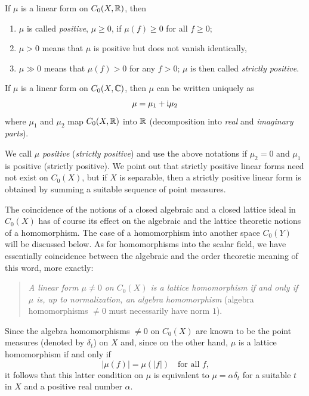 If\/ $\mu$ is a linear form on $C_{0}(X,\mathbb{R})$, then
\begin{enumerate}[\upshape (i), labelindent=.25em]

\item
$ \mu $ is called \emph{positive}, $\mu \geq 0$, if $ \mu(f) \geq 0 $ for all $ f \geq 0 $;  
\item
$ \mu > 0 $ means that $ \mu $ is positive but does not vanish identically,

\item
$ \mu \gg 0 $ means that $ \mu(f) > 0 $ for any $ f > 0 $;  $ \mu $ is then called \emph{strictly positive}.

\end{enumerate}
If\/ $\mu$ is a linear form on $C_{0}(X,\mathbb{C})$, then $\mu$ can be written uniquely as 
%
\[
	\mu = \mu_{1} + \mathrm{i} \mu_{2}
\]
%
where $\mu_{1}$ and $\mu_{2}$ map $C_{0}(X,\mathbb{R})$ into $\mathbb{R}$ (decomposition into \emph{real} and \emph{imaginary parts}).

We call $\mu$ \emph{positive} (\emph{strictly positive}) and use the above notations if\/ $\mu_{2} = 0$ and $\mu_{1}$ is positive (strictly positive).
We point out that strictly positive linear forms need not exist on $C_{0}(X)$, but if\/ $X$ is separable, then a strictly positive linear form is obtained by summing a suitable sequence of point measures.

The coincidence of the notions of a closed algebraic and a closed lattice ideal in $C_{0}(X)$ has of course its effect on the algebraic and the lattice theoretic notions of a homomorphism.
The case of a homomorphism into another space $C_{0}(Y)$ will be discussed below.
As for homomorphisms into the scalar field, we have essentially coincidence between the algebraic and the order theoretic meaning of this word, more exactly: 
\begin{quote}
\emph{A linear form $\mu \neq 0$ on $C_{0}(X)$ is a lattice homomorphism if and only if\/ $\mu$ is, up to normalization, an algebra homomorphism }(algebra homomorphisms $\neq 0$ must necessarily have norm $1$).
\end{quote}
Since the algebra homomorphisms $\neq 0$ on $C_{0}(X)$ are known to be the point measures (denoted by $\delta_{t}$) on $X$ and, since on the other hand, $\mu$ is a lattice homomorphism if and only if 
%
\[
	|\mu(f)| =  \mu(|f|) \quad \text{for all $f$,}
\]
%
it follows that this latter condition on $\mu$ is equivalent to $\mu = \alpha\delta_{t}$ for a suitable $t$ in $X$ and a positive real number $\alpha$.

